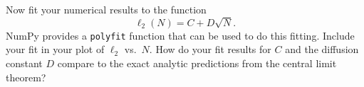 \documentclass[12 pt]{article} %
\newcommand{\showmarks}[1]{\rightline{\texttt{[#1 marks]}}} %
\begin{document}
\showmarks{4}

Now fit your numerical results to the function
\begin{equation*}
  \ell_2(N) = C + D \sqrt{N}.
\end{equation*}
NumPy provides a \texttt{polyfit} function that can be used to do this fitting.
Include your fit in your plot of $\ell_2$ vs.\ $N$.
How do your fit results for $C$ and the diffusion constant $D$ compare to the exact analytic predictions from the central limit theorem?

\showmarks{6}



\end{document}
